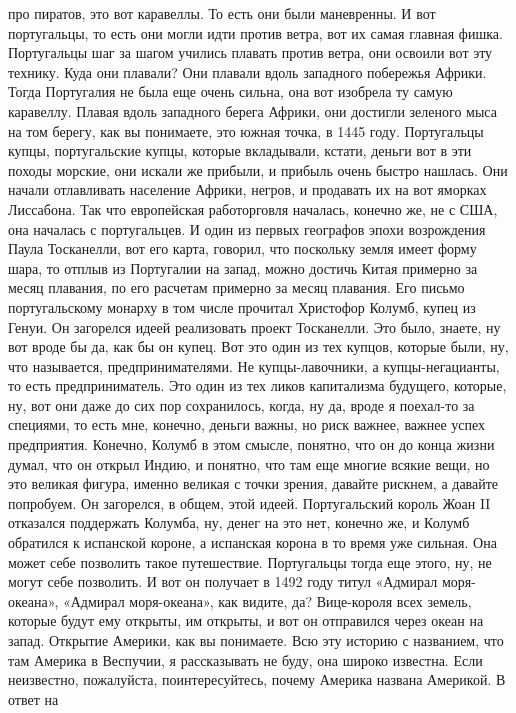 про пиратов, это вот каравеллы. То есть они были маневренны. И вот португальцы,
то есть они могли идти против ветра, вот их самая главная фишка. Португальцы шаг
за шагом учились плавать против ветра, они освоили вот эту технику. Куда они
плавали? Они плавали вдоль западного побережья Африки. Тогда Португалия не была
еще очень сильна, она вот изобрела ту самую каравеллу. Плавая вдоль западного
берега Африки, они достигли зеленого мыса на том берегу, как вы понимаете, это
южная точка, в 1445 году. Португальцы купцы, португальские купцы, которые
вкладывали, кстати, деньги вот в эти походы морские, они искали же прибыли, и
прибыль очень быстро нашлась. Они начали отлавливать население Африки, негров, и
продавать их на вот яморках Лиссабона. Так что европейская работорговля
началась, конечно же, не с США, она началась с португальцев. И один из первых
географов эпохи возрождения Паула Тосканелли, вот его карта, говорил, что
поскольку земля имеет форму шара, то отплыв из Португалии на запад, можно
достичь Китая примерно за месяц плавания, по его расчетам примерно за месяц
плавания. Его письмо португальскому монарху в том числе прочитал Христофор
Колумб, купец из Генуи. Он загорелся идеей реализовать проект Тосканелли. Это
было, знаете, ну вот вроде бы да, как бы он купец. Вот это один из тех купцов,
которые были, ну, что называется, предпринимателями. Не купцы-лавочники, а
купцы-негацианты, то есть предприниматель. Это один из тех ликов капитализма
будущего, которые, ну, вот они даже до сих пор сохранилось, когда, ну да, вроде
я поехал-то за специями, то есть мне, конечно, деньги важны, но риск важнее,
важнее успех предприятия. Конечно, Колумб в этом смысле, понятно, что он до
конца жизни думал, что он открыл Индию, и понятно, что там еще многие всякие
вещи, но это великая фигура, именно великая с точки зрения, давайте рискнем, а
давайте попробуем. Он загорелся, в общем, этой идеей. Португальский король Жоан
II отказался поддержать Колумба, ну, денег на это нет, конечно же, и Колумб
обратился к испанской короне, а испанская корона в то время уже сильная. Она
может себе позволить такое путешествие. Португальцы тогда еще этого, ну, не
могут себе позволить. И вот он получает в 1492 году титул «Адмирал моря-океана»,
«Адмирал моря-океана», как видите, да? Вице-короля всех земель, которые будут
ему открыты, им открыты, и вот он отправился через океан на запад. Открытие
Америки, как вы понимаете. Всю эту историю с названием, что там Америка в
Веспучии, я рассказывать не буду, она широко известна. Если неизвестно,
пожалуйста, поинтересуйтесь, почему Америка названа Америкой. В ответ на
